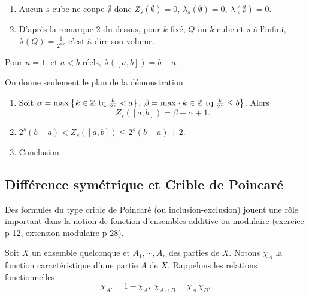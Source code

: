 \begin{rems}
 \begin{enumerate}
  \item Aucun $s$-cube ne coupe $\emptyset$ donc $Z_s(\emptyset)=0$, $\lambda_s(\emptyset)=0$, $\lambda(\emptyset)=0$.
  \item D'après la remarque 2 du dessus, pour $k$ fixé, $Q$ un $k$-cube et $s$ à l'infini, $\lambda(Q)= \frac{1}{2^{nk}}$ c'est à dire son volume.
 \end{enumerate}

 \begin{propn}
  Pour $n=1$, et $a < b$ réels, $\lambda([a,b]) = b - a$.
 \end{propn}
 \begin{demo}
  On donne seulement le plan de la démonstration
  \begin{enumerate}
   \item Soit $\alpha = \max \left\lbrace k \in \mathbb{Z} \text{ tq } \frac{k}{2^s} < a\right\rbrace$, $\beta = \max \left\lbrace k \in \mathbb{Z} \text{ tq } \frac{k}{2^s} \leq b\right\rbrace$. Alors
   \begin{displaymath}
    Z_s([a,b]) = \beta - \alpha + 1.
   \end{displaymath}
   \item $2^s(b-a) < Z_s([a,b]) \leq 2^s(b-a) + 2$.
   \item Conclusion.
  \end{enumerate}
 \end{demo}
\end{rems}

\subsection{Différence symétrique et Crible de Poincaré}\label{criblePoinc}
Des formules du type crible de Poincaré (ou inclusion-exclusion) jouent une rôle important dans la notion de fonction d'ensembles additive ou modulaire (exercice p 12, extension modulaire p 28).

\noindent Soit $X$ un ensemble quelconque et $A_1, \cdots, A_p$ des parties de $X$. Notons $\chi_A$ la fonction caractéristique d'une partie $A$ de $X$. Rappelons les relations fonctionnelles
\begin{displaymath}
  \chi_{A'} = 1 - \chi_A, \; \chi_{A \cap B} = \chi_A \, \chi_B.
\end{displaymath}

